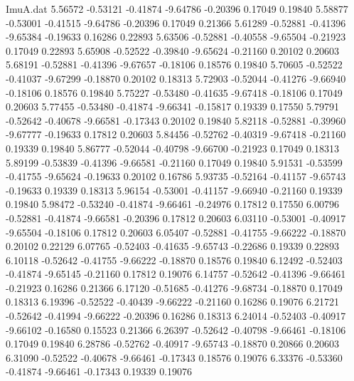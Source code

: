 \begin{filecontents}{ImuA.dat}
   5.56572   -0.53121   -0.41874   -9.64786   -0.20396    0.17049    0.19840
   5.58877   -0.53001   -0.41515   -9.64786   -0.20396    0.17049    0.21366
   5.61289   -0.52881   -0.41396   -9.65384   -0.19633    0.16286    0.22893
   5.63506   -0.52881   -0.40558   -9.65504   -0.21923    0.17049    0.22893
   5.65908   -0.52522   -0.39840   -9.65624   -0.21160    0.20102    0.20603
   5.68191   -0.52881   -0.41396   -9.67657   -0.18106    0.18576    0.19840
   5.70605   -0.52522   -0.41037   -9.67299   -0.18870    0.20102    0.18313
   5.72903   -0.52044   -0.41276   -9.66940   -0.18106    0.18576    0.19840
   5.75227   -0.53480   -0.41635   -9.67418   -0.18106    0.17049    0.20603
   5.77455   -0.53480   -0.41874   -9.66341   -0.15817    0.19339    0.17550
   5.79791   -0.52642   -0.40678   -9.66581   -0.17343    0.20102    0.19840
   5.82118   -0.52881   -0.39960   -9.67777   -0.19633    0.17812    0.20603
   5.84456   -0.52762   -0.40319   -9.67418   -0.21160    0.19339    0.19840
   5.86777   -0.52044   -0.40798   -9.66700   -0.21923    0.17049    0.18313
   5.89199   -0.53839   -0.41396   -9.66581   -0.21160    0.17049    0.19840
   5.91531   -0.53599   -0.41755   -9.65624   -0.19633    0.20102    0.16786
   5.93735   -0.52164   -0.41157   -9.65743   -0.19633    0.19339    0.18313
   5.96154   -0.53001   -0.41157   -9.66940   -0.21160    0.19339    0.19840
   5.98472   -0.53240   -0.41874   -9.66461   -0.24976    0.17812    0.17550
   6.00796   -0.52881   -0.41874   -9.66581   -0.20396    0.17812    0.20603
   6.03110   -0.53001   -0.40917   -9.65504   -0.18106    0.17812    0.20603
   6.05407   -0.52881   -0.41755   -9.66222   -0.18870    0.20102    0.22129
   6.07765   -0.52403   -0.41635   -9.65743   -0.22686    0.19339    0.22893
   6.10118   -0.52642   -0.41755   -9.66222   -0.18870    0.18576    0.19840
   6.12492   -0.52403   -0.41874   -9.65145   -0.21160    0.17812    0.19076
   6.14757   -0.52642   -0.41396   -9.66461   -0.21923    0.16286    0.21366
   6.17120   -0.51685   -0.41276   -9.68734   -0.18870    0.17049    0.18313
   6.19396   -0.52522   -0.40439   -9.66222   -0.21160    0.16286    0.19076
   6.21721   -0.52642   -0.41994   -9.66222   -0.20396    0.16286    0.18313
   6.24014   -0.52403   -0.40917   -9.66102   -0.16580    0.15523    0.21366
   6.26397   -0.52642   -0.40798   -9.66461   -0.18106    0.17049    0.19840
   6.28786   -0.52762   -0.40917   -9.65743   -0.18870    0.20866    0.20603
   6.31090   -0.52522   -0.40678   -9.66461   -0.17343    0.18576    0.19076
   6.33376   -0.53360   -0.41874   -9.66461   -0.17343    0.19339    0.19076

\end{filecontents}
